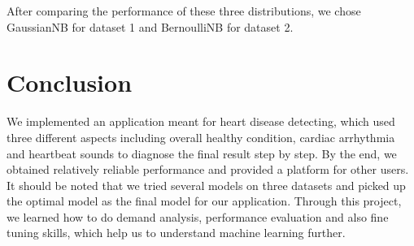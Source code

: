 \documentclass[letterpaper]{article} %
\begin{document}
After comparing the performance of these three distributions, we chose GaussianNB for dataset 1 and BernoulliNB for dataset 2.

\section{Conclusion}

We implemented an application meant for heart disease detecting, which used three different aspects including overall healthy condition, cardiac arrhythmia and heartbeat sounds to diagnose the final result step by step. By the end, we obtained relatively reliable performance and provided a platform for other users. It should be noted that we tried several models on three datasets and picked up the optimal model as the final model for our application. Through this project, we learned how to do demand analysis, performance evaluation and also fine tuning skills, which help us to understand machine learning further.

\newpage


\end{document}
